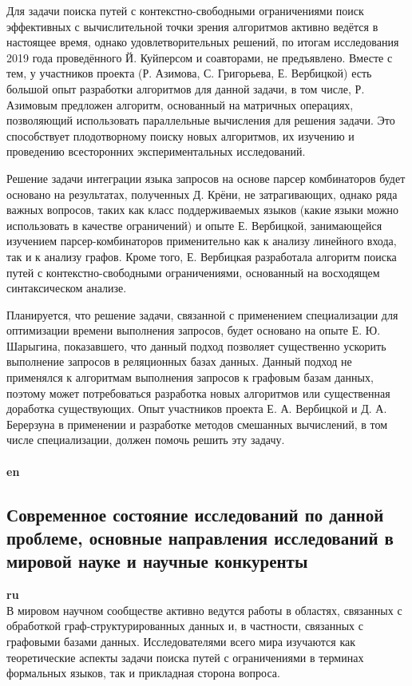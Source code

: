 \documentclass[12pt]{article}  %
\theoremstyle{remark}
\begin{document}
Для задачи поиска путей с контекстно-свободными ограничениями поиск эффективных с вычислительной точки зрения алгоритмов активно ведётся в настоящее время, однако удовлетворительных решений, по итогам исследования 2019 года проведённого Й. Куйперсом и соавторами, не предъявлено.
Вместе с тем, у участников проекта (Р. Азимова, С. Григорьева, Е. Вербицкой) есть большой опыт разработки алгоритмов для данной задачи, в том числе, Р. Азимовым предложен алгоритм, основанный на матричных операциях, позволяющий использовать параллельные вычисления для решения задачи. Это способствует плодотворному поиску новых алгоритмов, их изучению и проведению всесторонних экспериментальных исследований.

Решение задачи интеграции языка запросов на основе парсер комбинаторов будет основано на результатах, полученных Д. Крёни, не затрагивающих, однако ряда важных вопросов, таких как класс поддерживаемых языков (какие языки можно использовать в качестве ограничений) и опыте Е. Вербицкой, занимающейся изучением парсер-комбинаторов применительно как к анализу линейного входа, так и к анализу графов.
Кроме того, Е. Вербицкая разработала алгоритм поиска путей с контекстно-свободными ограничениями, основанный на восходящем синтаксическом анализе.

Планируется, что решение задачи, связанной с применением специализации для оптимизации времени выполнения запросов, будет основано на опыте Е. Ю. Шарыгина, показавшего, что данный подход позволяет существенно ускорить выполнение запросов в реляционных базах данных. Данный подход не применялся к алгоритмам выполнения запросов к графовым базам данных, поэтому может потребоваться разработка новых алгоритмов или существенная доработка существующих. Опыт участников проекта Е. А. Вербицкой и Д. А. Берерзуна в применении и разработке методов смешанных вычислений, в том числе специализации, должен помочь решить эту задачу.
\\
\\
\textbf{en}\\

\subsection{Современное состояние исследований по данной проблеме, основные направления исследований в мировой науке и научные конкуренты}

\textbf{ru}\\
%
В мировом научном сообществе активно ведутся работы в областях, связанных с обработкой граф-структурированных данных и, в частности, связанных с графовыми базами данных. Исследователями всего мира изучаются как теоретические аспекты задачи поиска путей с ограничениями в терминах формальных языков, так и прикладная сторона вопроса.
\end{document}
